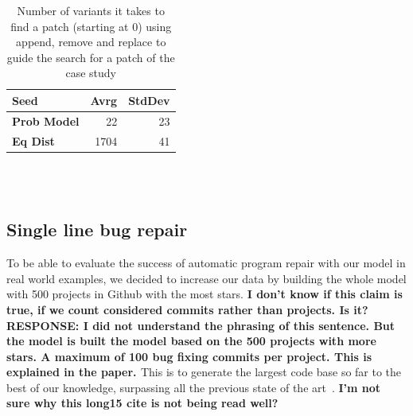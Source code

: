 \documentclass[conference]{IEEEtran}
\newcommand{\todo}[1]
  {{\scriptsize \textbf{\color{red} {#1}}}}
\begin{document}
\begin{table}[ht]
\begin{tabular}{lrr}
\hline
\textbf{Seed} & Avrg & StdDev  \\
\hline
\textbf{Prob Model} & 22 & 23\\

\textbf{Eq Dist} & 1704 & 41 \\
\hline
\end{tabular}
\\
\\
  \caption{Number of variants it takes to find a patch (starting at 0) using append, remove and replace to guide the search for a patch of 
the case study}
  \label{fig:resultsARR}
\end{table} 

\subsection{Single line bug repair}
\label{sec:single}

To be able to evaluate the success of automatic program repair with our model in real world examples, we decided 
to increase our data by building the whole model with 500 projects in Github with the most 
stars.\todo{I don't know if this claim is true, if we count considered commits
  rather than projects.  Is it? RESPONSE: I did not understand the phrasing of this sentence. But the model is built the model based on the 500 projects with more stars. A maximum of 100 bug fixing commits per project. This is explained in the paper. } This is to generate the largest code base so far to the best 
of our knowledge, surpassing all the previous state of the 
art~\cite{long15,Soto15,zhong15,martinez15,xuan16}. 
\todo{I'm not sure why this long15 cite is not being read well?}
\end{document}

